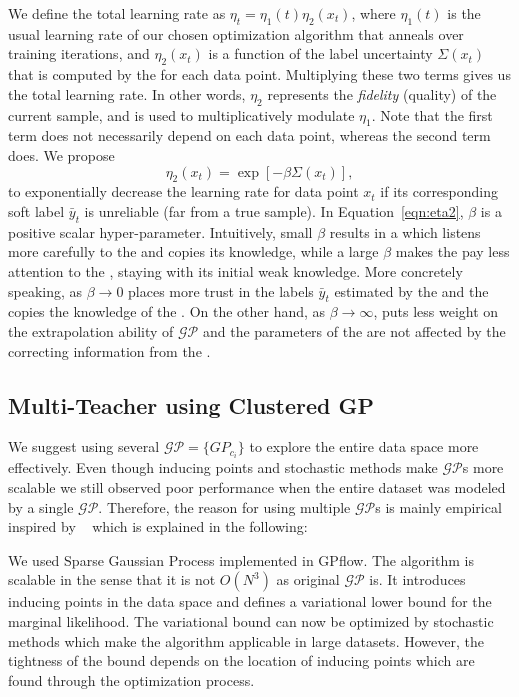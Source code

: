 We define the total learning rate as $\eta_t = \eta_1(t)\eta_2(x_t)$, where $\eta_1(t)$ is the usual learning rate of our chosen optimization algorithm that anneals over training iterations, and $\eta_2(x_t)$ is a function of the label uncertainty $\Sigma(x_t)$ that is computed by the \tch for each data point. Multiplying these two terms gives us the total learning rate. In other words, $\eta_2$ represents the \emph{fidelity} (quality) of the current sample, and is used to multiplicatively modulate $\eta_1$. Note that the first term does not necessarily depend on each data point, whereas the second term does. We propose
\begin{equation}
 \label{eqn:eta2}
 \eta_2(x_t) = \exp[-\beta \Sigma(x_t)],    
\end{equation}
to exponentially decrease the learning rate for data point $x_t$ if its corresponding soft label $\bar{y}_t$ is unreliable (far from a true sample). In Equation~\ref{eqn:eta2}, $\beta$ is a positive scalar hyper-parameter. Intuitively, small $\beta$ results in a \std which listens more carefully to the \tch and copies its knowledge, while a large $\beta$ makes the \std pay less attention to the \tch, staying with its initial weak knowledge. 
More concretely speaking, as $\beta \to 0$ \std places more trust in the labels $\bar{y}_t$ estimated by the \tch and the \std copies the knowledge of the \tch. On the other hand, as $\beta \to \infty$, \std puts less weight on the extrapolation ability of $\mathcal{GP}$ and the parameters of the \std are not affected by the correcting information from the \tch. 


\subsection{Multi-Teacher \fwl using Clustered GP}
\label{sec:CGP}
We suggest using several $\mathcal{GP}=\{GP_{c_i}\}$ to explore the entire data space more effectively. Even though inducing points and stochastic methods make $\mathcal{GP}$s more scalable we still observed poor performance when the entire dataset was modeled by a single $\mathcal{GP}$. Therefore, the reason for using multiple $\mathcal{GP}$s is mainly empirical inspired by ~\citep{shen2006fast} which is explained in the following:

We used Sparse Gaussian Process implemented in GPflow. The algorithm is scalable in the sense that it is not $O(N^3)$ as original $\mathcal{GP}$ is. It introduces inducing points in the data space and defines a variational lower bound for the marginal likelihood. The variational bound can now be optimized by stochastic methods which make the algorithm applicable in large datasets. However, the tightness of the bound depends on the location of inducing points which are found through the optimization process. 

